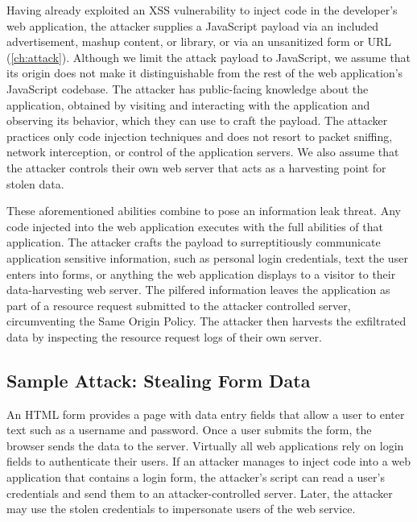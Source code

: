 Having already exploited an XSS vulnerability to inject code in the developer's web application, the attacker supplies a JavaScript payload via an included advertisement, mashup content, or library, or via an unsanitized form or URL (\autoref{ch:attack}).
Although we limit the attack payload to JavaScript, we assume that its origin does not make it distinguishable from the rest of the web application's JavaScript codebase.
The attacker has public-facing knowledge about the application, obtained by visiting and interacting with the application and observing its behavior, which they can use to craft the payload.
The attacker practices only code injection techniques and does not resort to packet sniffing, network interception, or control of the application servers.
We also assume that the attacker controls their own web server that acts as a harvesting point for stolen data.

These aforementioned abilities combine to pose an information leak threat.
Any code injected into the web application executes with the full abilities of that application.
The attacker crafts the payload to surreptitiously communicate application sensitive information, such as personal login credentials, text the user enters into forms, or anything the web application displays to a visitor to their data-harvesting web server.
The pilfered information leaves the application as part of a resource request submitted to the attacker controlled server, circumventing the Same Origin Policy.
The attacker then harvests the exfiltrated data by inspecting the resource request logs of their own server.

\subsection{Sample Attack: Stealing Form Data}\label{sec:defense-stealingformdata}

An HTML form provides a page with data entry fields that allow a user to enter text such as a username and password.
Once a user submits the form, the browser sends the data to the server.
Virtually all web applications rely on login fields to authenticate their users.
If an attacker manages to inject code into a web application that contains a login form, the attacker's script can read a user's credentials and send them to an attacker-controlled server.
Later, the attacker may use the stolen credentials to impersonate users of the web service.

